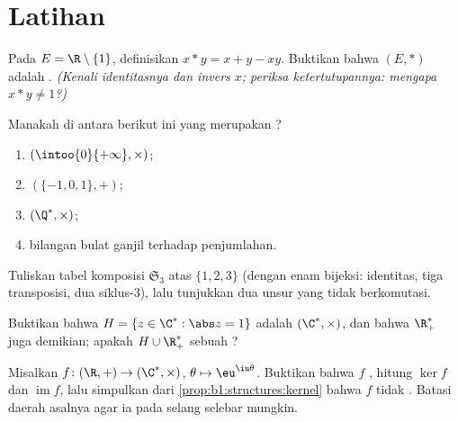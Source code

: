\section{Latihan}

\begin{exercise}[$\star$]\label{exo:b1:structures:1}
Pada $E = \R \setminus \{1\}$, definisikan $x * y = x + y - xy$. Buktikan bahwa
$(E, *)$ adalah . \emph{(Kenali identitasnya dan
invers $x$; periksa ketertutupannya: mengapa $x * y \neq 1$?)}
\end{exercise}

\begin{exercise}[$\star$]\label{exo:b1:structures:2}
Manakah di antara berikut ini yang merupakan ?
\begin{enumerate}
  \item $(\intoo{0}{+\infty}, \times)$;
  \item $(\{-1, 0, 1\}, +)$;
  \item $(\Q^*, \times)$;
  \item {} bilangan bulat ganjil terhadap penjumlahan.
\end{enumerate}
\end{exercise}

\begin{exercise}[$\star$]\label{exo:b1:structures:3}
Tuliskan tabel komposisi  $\mathfrak{S}_3$
atas $\{1,2,3\}$ (dengan enam bijeksi: identitas, tiga transposisi, dua
siklus-$3$), lalu tunjukkan dua unsur yang tidak berkomutasi.
\end{exercise}

\begin{exercise}[$\star$]\label{exo:b1:structures:4}
Buktikan bahwa $H = \{z \in \C^* : \abs z = 1\}$ adalah  $(\C^*,
\times)$, dan bahwa $\R_+^*$ juga demikian; apakah $H \cup \R_+^*$ sebuah
?
\end{exercise}

\begin{exercise}[$\star\star$]\label{exo:b1:structures:5}
Misalkan $f \colon (\R, +) \to (\C^*, \times)$, $\theta \mapsto
\eu^{\iu\theta}$. Buktikan bahwa $f$ , hitung $\ker f$ dan
$\operatorname{im} f$, lalu simpulkan dari
\cref{prop:b1:structures:kernel} bahwa $f$ tidak . Batasi
daerah asalnya agar ia  pada selang selebar mungkin.
\end{exercise}

